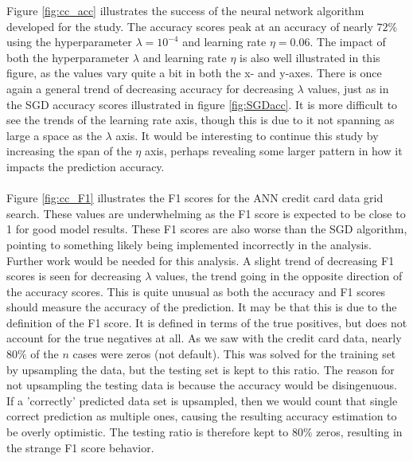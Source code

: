         Figure \ref{fig:cc_acc} illustrates the success of the neural network algorithm developed for the study. The accuracy scores peak at an accuracy of nearly $72\%$ using the hyperparameter $\lambda = 10^{-4}$ and learning rate $\eta = 0.06$. The impact of both the hyperparameter $\lambda$ and learning rate $\eta$ is also well illustrated in this figure, as the values vary quite a bit in both the x- and y-axes. There is once again a general trend of decreasing accuracy for decreasing $\lambda$ values, just as in the SGD accuracy scores illustrated in figure \ref{fig:SGDacc}. It is more difficult to see the trends of the learning rate axis, though this is due to it not spanning as large a space as the $\lambda$ axis. It would be interesting to continue this study by increasing the span of the $\eta$ axis, perhaps revealing some larger pattern in how it impacts the prediction accuracy.\\\\ 
        Figure \ref{fig:cc_F1} illustrates the F1 scores for the ANN credit card data grid search. These values are underwhelming as the F1 score is expected to be close to 1 for good model results. These F1 scores are also worse than the SGD algorithm, pointing to something likely being implemented incorrectly in the analysis. Further work would be needed for this analysis. A slight trend of decreasing F1 scores is seen for decreasing $\lambda$ values, the trend going in the opposite direction of the accuracy scores. This is quite unusual as both the accuracy and F1 scores should measure the accuracy of the prediction. It may be that this is due to the definition of the F1 score. It is defined in terms of the true positives, but does not account for the true negatives at all. As we saw with the credit card data, nearly $80\%$ of the $n$ cases were zeros (not default). This was solved for the training set by upsampling the data, but the testing set is kept to this ratio. The reason for not upsampling the testing data is because the accuracy would be disingenuous. If a 'correctly' predicted data set is upsampled, then we would count that single correct prediction as multiple ones, causing the resulting accuracy estimation to be overly optimistic. The testing ratio is therefore kept to $80\%$ zeros, resulting in the strange F1 score behavior.\\\\
